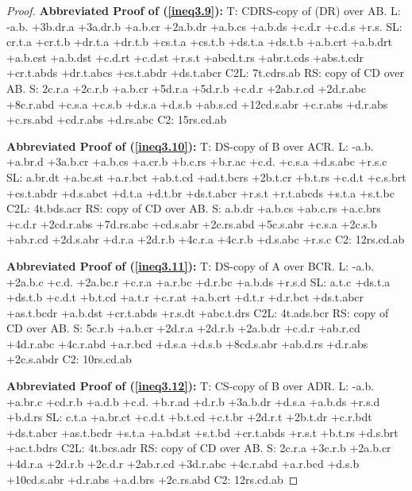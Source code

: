 \documentclass[10pt,journal]{IEEEtran}
\begin{document}
\begin{proof}
{\bf Abbreviated Proof of (\ref{ineq3.9}):}
T: CDRS-copy of (DR) over AB.\newline
L: -a.b. +3b.dr.a +3a.dr.b +a.b.cr +2a.b.dr +a.b.cs +a.b.ds +c.d.r +c.d.s +r.s.\newline
SL: cr.t.a +cr.t.b +dr.t.a +dr.t.b +cs.t.a +cs.t.b +ds.t.a +ds.t.b +a.b.crt +a.b.drt +a.b.cst +a.b.dst +c.d.rt +c.d.st +r.s.t +abcd.t.rs +abr.t.cds +abs.t.cdr +cr.t.abds +dr.t.abcs +cs.t.abdr +ds.t.abcr
C2L: 7t.cdrs.ab\newline
RS:
copy of CD over AB.\newline
S: 2c.r.a +2c.r.b +a.b.cr +5d.r.a +5d.r.b +c.d.r +2ab.r.cd +2d.r.abc +8c.r.abd +c.s.a +c.s.b +d.s.a +d.s.b +ab.s.cd +12cd.s.abr +c.r.abs +d.r.abs +c.rs.abd +cd.r.abs +d.rs.abc
C2: 15rs.cd.ab\newline


{\bf Abbreviated Proof of (\ref{ineq3.10}):}
T: DS-copy of B over ACR.\newline
L: -a.b. +a.br.d +3a.b.cr +a.b.cs +a.cr.b +b.c.rs +b.r.ac +c.d. +c.s.a +d.s.abc +r.s.c\newline
SL: a.br.dt +a.bc.st +a.r.bct +ab.t.cd +ad.t.bcrs +2b.t.cr +b.t.rs +c.d.t +c.s.brt +cs.t.abdr +d.s.abct +d.t.a +d.t.br +ds.t.abcr +r.s.t +r.t.abcds +s.t.a +s.t.bc
C2L: 4t.bds.acr\newline
RS:
copy of CD over AB.\newline
S: a.b.dr +a.b.cs +ab.c.rs +a.c.brs +c.d.r +2cd.r.abs +7d.rs.abc +cd.s.abr +2c.rs.abd +5c.s.abr +c.s.a +2c.s.b +ab.r.cd +2d.s.abr +d.r.a +2d.r.b +4c.r.a +4c.r.b +d.s.abc +r.s.c
C2: 12rs.cd.ab\newline


{\bf Abbreviated Proof of (\ref{ineq3.11}):}
T: DS-copy of A over BCR.\newline
L: -a.b. +2a.b.c +c.d. +2a.bc.r +c.r.a +a.r.bc +d.r.bc +a.b.ds +r.s.d\newline
SL: a.t.c +ds.t.a +ds.t.b +c.d.t +b.t.cd +a.t.r +c.r.at +a.b.crt +d.t.r +d.r.bct +ds.t.abcr +as.t.bcdr +a.b.dst +cr.t.abds +r.s.dt +abc.t.drs
C2L: 4t.ads.bcr\newline
RS:
copy of CD over AB.\newline
S: 5c.r.b +a.b.cr +2d.r.a +2d.r.b +2a.b.dr +c.d.r +ab.r.cd +4d.r.abc +4c.r.abd +a.r.bcd +d.s.a +d.s.b +8cd.s.abr +ab.d.rs +d.r.abs +2c.s.abdr
C2: 10rs.cd.ab\newline


{\bf Abbreviated Proof of (\ref{ineq3.12}):}
T: CS-copy of B over ADR.\newline
L: -a.b. +a.br.c +cd.r.b +a.d.b +c.d. +b.r.ad +d.r.b +3a.b.dr +d.s.a +a.b.ds +r.s.d +b.d.rs\newline
SL: c.t.a +a.br.ct +c.d.t +b.t.cd +c.t.br +2d.r.t +2b.t.dr +c.r.bdt +ds.t.abcr +as.t.bcdr +s.t.a +a.bd.st +s.t.bd +cr.t.abds +r.s.t +b.t.rs +d.s.brt +ac.t.bdrs
C2L: 4t.bcs.adr\newline
RS:
copy of CD over AB.\newline
S: 2c.r.a +3c.r.b +2a.b.cr +4d.r.a +2d.r.b +2c.d.r +2ab.r.cd +3d.r.abc +4c.r.abd +a.r.bcd +d.s.b +10cd.s.abr +d.r.abs +a.d.brs +2c.rs.abd
C2: 12rs.cd.ab\newline


\end{proof}
\end{document}
